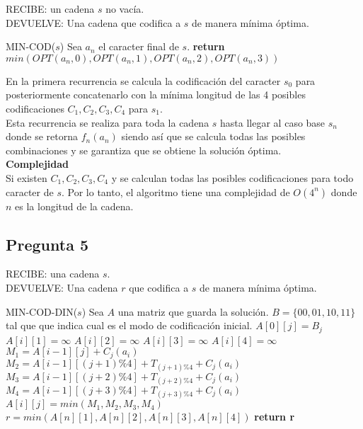\documentclass{article}
\begin{document}
\newpage

\noindent RECIBE: un cadena $s$ no vacía.\\
DEVUELVE: Una cadena que codifica a $s$ de manera mínima óptima.
\begin{algorithmic}[1]
\item[]{MIN-COD($s$)}
\State Sea $a_n$ el caracter final de $s$.  
\State \textbf{return} $min(OPT(a_n,0), OPT(a_n,1), OPT(a_n,2), OPT(a_n,3))$  
\end{algorithmic}

En la primera recurrencia se calcula la codificación del caracter $s_0$ para posteriormente concatenarlo
con la mínima longitud de las 4 posibles codificaciones $C_1,C_2,C_3,C_4$ para $s_1$.\\
Esta recurrencia se realiza para toda la cadena $s$ hasta llegar al caso base $s_n$ donde se retorna $f_n(a_n)$
siendo así que se calcula todas las posibles combinaciones y se garantiza que se obtiene la solución óptima.\\

\textbf{Complejidad}\\
Si existen $C_1,C_2,C_3,C_4$ y se calculan todas las posibles codificaciones para todo caracter de $s$.
Por lo tanto, el algoritmo tiene una complejidad de $O(4^n)$ donde $n$ es la longitud de la cadena.



\subsection{Pregunta 5}
\noindent RECIBE: una cadena $s$.\\
DEVUELVE: Una cadena $r$ que codifica a $s$ de manera mínima óptima.

\begin{algorithmic}[1]
\item[]{MIN-COD-DIN($s$)}
\State Sea $A$ una matriz que guarda la solución.
\State $B=\{00, 01, 10, 11\}$ tal que que indica cual es el modo de codificación inicial.
    \State $A[0][j] = B_j$
\EndFor
{}
    \State $A[i][1] = \infty$
    \State $A[i][2] = \infty$
    \State $A[i][3] = \infty$
    \State $A[i][4] = \infty$
            \State $M_1 = A[i-1][j] + C_j(a_i)$
            \State $M_2 = A[i-1][(j+1)\%4] + T_{(j+1)\%4} + C_{j}(a_i)$
            \State $M_3 = A[i-1][(j+2)\%4] + T_{(j+2)\%4} + C_{j}(a_i)$
            \State $M_4 = A[i-1][(j+3)\%4] + T_{(j+3)\%4} + C_{j}(a_i)$
            \State $A[i][j] = min(M_1, M_2, M_3, M_4)$
            \State
        \EndIf
    \EndFor
\EndFor
\State $r = min(A[n][1], A[n][2], A[n][3], A[n][4])$
\State \textbf{return r}  
\end{algorithmic}
\end{document}
